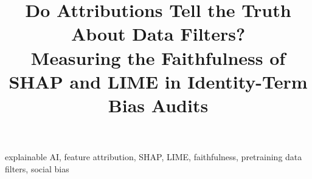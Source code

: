 \documentclass[conference]{IEEEtran}
\begin{document}
\title{Do Attributions Tell the Truth About Data Filters?\\[0.2em]
{\Large Measuring the Faithfulness of SHAP and LIME in Identity-Term Bias Audits}}

\author{
}

\maketitle

\begin{abstract}

\end{abstract}

\begin{IEEEkeywords}
explainable AI, feature attribution, SHAP, LIME, faithfulness, pretraining data filters, social bias
\end{IEEEkeywords}








\clearpage



\end{document}
